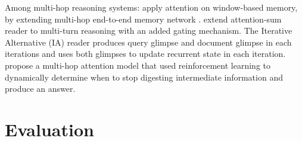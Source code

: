 \documentclass[11pt,letterpaper]{article}
\begin{document}
Among multi-hop reasoning systems:  apply attention on window-based memory, by extending multi-hop end-to-end memory network \cite{memN2N_Sukhbaatar:2015ww}.  extend attention-sum reader to multi-turn reasoning with an added gating mechanism. The Iterative Alternative (IA) reader \cite{Sordoni:2016wb} produces query glimpse and document glimpse in each iterations and uses both glimpses to update recurrent state in each iteration.  propose a multi-hop attention model that used reinforcement learning to dynamically determine when to stop digesting intermediate information and produce an answer.
 
\section{Evaluation}
\end{document}
